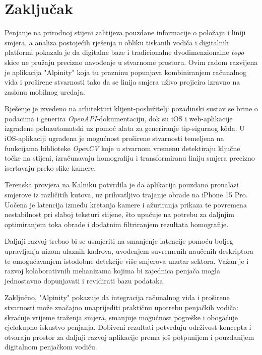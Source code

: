 \chapter{Zaključak}

Penjanje na prirodnoj stijeni zahtijeva pouzdane informacije o položaju i liniji smjera, a analiza postojećih rješenja u obliku tiskanih vodiča i digitalnih platformi pokazala je da digitalne baze i tradicionalne dvodimenzionalne \textit{topo} skice ne pružaju precizno navođenje u stvarnome prostoru. Ovim radom razvijena je aplikacija "Alpinity" koja tu prazninu popunjava kombiniranjem računalnog vida i proširene stvarnosti tako da se linija smjera uživo projicira izravno na zaslonu mobilnog uređaja.

Rješenje je izvedeno na arhitekturi klijent-poslužitelj: pozadinski sustav se brine o podacima i generira \textit{OpenAPI}-dokumentaciju, dok su iOS i web-aplikacije izgrađene poluautomatski uz pomoć alata za generiranje tip-sigurnog kôda. U iOS-aplikaciji ugrađena je mogućnost proširene stvarnosti temeljena na funkcijama biblioteke \textit{OpenCV} koje u stvarnom vremenu detektiraju ključne točke na stijeni, izračunavaju homografiju i transformiranu liniju smjera precizno iscrtavaju preko slike kamere.

Terenska provjera na Kalniku potvrdila je da aplikacija pouzdano pronalazi smjerove iz različitih kutova, uz prihvatljivo trajanje obrade na iPhone 15 Pro. Uočena je latencija između kretanja kamere i ažuriranja prikaza te povremena nestabilnost pri slaboj teksturi stijene, što upućuje na potrebu za daljnjim optimiranjem toka obrade i dodatnim filtriranjem rezultata homografije.

Daljnji razvoj trebao bi se usmjeriti na smanjenje latencije pomoću boljeg upravljanja nizom ulaznih kadrova, uvođenjem suvremenih naučenih deskriptora te omogućavanjem istodobne detekcije više smjerova unutar sektora. Važan je i razvoj kolaborativnih mehanizama kojima bi zajednica penjača mogla jednostavno dopunjavati i revidirati bazu podataka.

Zaključno, "Alpinity" pokazuje da integracija računalnog vida i proširene stvarnosti može značajno unaprijediti praktičnu upotrebu penjačkih vodiča: skraćuje vrijeme traženja smjera, smanjuje mogućnost pogreške i obogaćuje cjelokupno iskustvo penjanja. Dobiveni rezultati potvrđuju održivost koncepta i otvaraju prostor za daljnji razvoj aplikacije prema još potpunijem i pouzdanijem digitalnom penjačkom vodiču.
